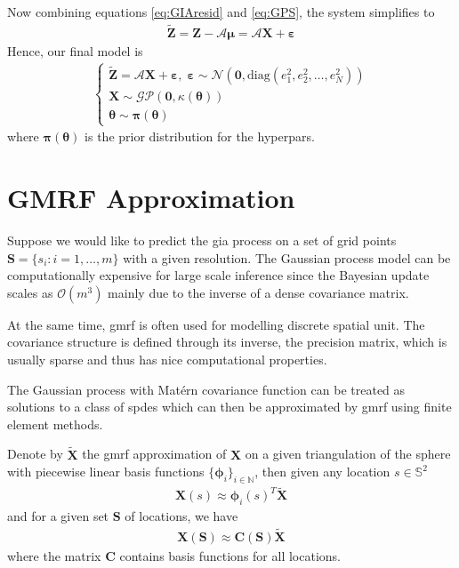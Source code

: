 \documentclass[a4paper,12pt]{article}
\begin{document}
Now combining equations \ref{eq:GIAresid} and \ref{eq:GPS}, the system simplifies to
\begin{align}
\bm{\tilde{Z}} = \bm{Z} - \bm{\mathcal{A}}\bm{\mu}= \bm{\mathcal{A}}\bm{X} + \bm{\varepsilon}
\end{align}
Hence, our final model is
\begin{align}
\left\{ \begin{array}{l}
\bm{\tilde{Z}} = \bm{\mathcal{A}}\bm{X} + \bm{\varepsilon}, \; 
\bm{\varepsilon} \sim \mathcal{N} (\bm{0}, \mbox{diag}(e_1^2, e_2^2, \dots, e_N^2)) \\
\bm{X} \sim \mathcal{GP}(\bm{0}, \kappa(\bm{\theta})) \\
\bm{\theta} \sim \bm{\pi}(\bm{\theta})
\end{array} \right.
\end{align}
where $\bm{\pi}(\bm{\theta})$ is the prior distribution for the \gls{hyperpars}.

\section{GMRF Approximation}
Suppose we would like to predict the \acrshort{gia} process on a set of grid points $\bm{S} = \{s_i: i = 1,\dots, m\}$ with a given resolution. The Gaussian process model can be computationally expensive for large scale inference since the Bayesian update scales as $\mathcal{O}(m^3)$ mainly due to the inverse of a dense covariance matrix. 

At the same time, \acrlong{gmrf} is often used for modelling discrete spatial unit. The covariance structure is defined through its inverse, the precision matrix, which is usually sparse and thus has nice computational properties.

The Gaussian process with Mat\'{e}rn covariance function can be treated as solutions to a class of \acrlong{spde}s \citep{Lindgren2011} which can then be approximated by \acrshort{gmrf} using finite element methods. 

Denote by $\bm{\tilde{X}}$ the \acrshort{gmrf} approximation of $\bm{X}$ on a given triangulation of the sphere with piecewise linear basis functions $\{ \bm{\phi}_i \}_{i \in \mathbb{N}}$, then given any location $s \in \mathbb{S}^2$
\begin{align}
\bm{X}(s) \approx \bm{\phi}_i(s)^T\bm{\tilde{X}}
\end{align}
and for a given set $\bm{S}$ of locations, we have  
\begin{align}
\bm{X}(\bm{S}) \approx \bm{C}(\bm{S})\bm{\tilde{X}}
\end{align}
where the matrix $\bm{C}$ contains basis functions for all locations.
\end{document}
